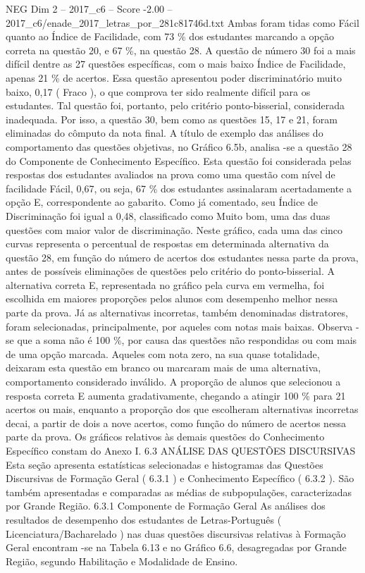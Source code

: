 \begin{textsample}{NEG Dim 2 – 2017\_c6 – Score -2.00 – 2017\_c6/enade\_2017\_letras\_por\_281c81746d.txt}
Ambas foram tidas como Fácil quanto ao Índice de Facilidade, com 73 \% dos estudantes marcando a opção correta na questão 20, e 67 \%, na questão 28.
A questão de número 30 foi a mais difícil dentre as 27 questões específicas, com o mais baixo Índice de Facilidade, apenas 21 \% de acertos.
Essa questão apresentou poder discriminatório muito baixo, 0,17 ( Fraco ), o que comprova ter sido realmente difícil para os estudantes.
Tal questão foi, portanto, pelo critério ponto-bisserial, considerada inadequada.
Por isso, a questão 30, bem como as questões 15, 17 e 21, foram eliminadas do cômputo da nota final.
A título de exemplo das análises do comportamento das questões objetivas, no Gráfico 6.5b, analisa -se a questão 28 do Componente de Conhecimento Específico.
Esta questão foi considerada pelas respostas dos estudantes avaliados na prova como uma questão com nível de facilidade Fácil, 0,67, ou seja, 67 \% dos estudantes assinalaram acertadamente a opção E, correspondente ao gabarito.
Como já comentado, seu Índice de Discriminação foi igual a 0,48, classificado como Muito bom, uma das duas questões com maior valor de discriminação.
Neste gráfico, cada uma das cinco curvas representa o percentual de respostas em determinada alternativa da questão 28, em função do número de acertos dos estudantes nessa parte da prova, antes de possíveis eliminações de questões pelo critério do ponto-bisserial.
A alternativa correta E, representada no gráfico pela curva em vermelha, foi escolhida em maiores proporções pelos alunos com desempenho melhor nessa parte da prova.
Já as alternativas incorretas, também denominadas distratores, foram selecionadas, principalmente, por aqueles com notas mais baixas.
Observa -se que a soma não é 100 \%, por causa das questões não respondidas ou com mais de uma opção marcada.
Aqueles com nota zero, na sua quase totalidade, deixaram esta questão em branco ou marcaram mais de uma alternativa, comportamento considerado inválido.
A proporção de alunos que selecionou a resposta correta E aumenta gradativamente, chegando a atingir 100 \% para 21 acertos ou mais, enquanto a proporção dos que escolheram alternativas incorretas decai, a partir de dois a nove acertos, como função do número de acertos nessa parte da prova.
Os gráficos relativos às demais questões do Conhecimento Específico constam do Anexo I. 6.3 ANÁLISE DAS QUESTÕES DISCURSIVAS Esta seção apresenta estatísticas selecionadas e histogramas das Questões Discursivas de Formação Geral ( 6.3.1 ) e Conhecimento Específico ( 6.3.2 ).
São também apresentadas e comparadas as médias de subpopulações, caracterizadas por Grande Região. 6.3.1 Componente de Formação Geral As análises dos resultados de desempenho dos estudantes de Letras-Português ( Licenciatura/Bacharelado ) nas duas questões discursivas relativas à Formação Geral encontram -se na Tabela 6.13 e no Gráfico 6.6, desagregadas por Grande Região, segundo Habilitação e Modalidade de Ensino.

\end{textsample}
